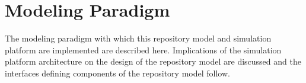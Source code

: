 \chapter{Modeling Paradigm}\label{ch:paradigm}

The modeling paradigm with which this repository model and simulation 
platform are implemented are described here. Implications of the 
simulation platform architecture on the design of the repository model 
are discussed and the interfaces defining components of the repository 
model follow. 




